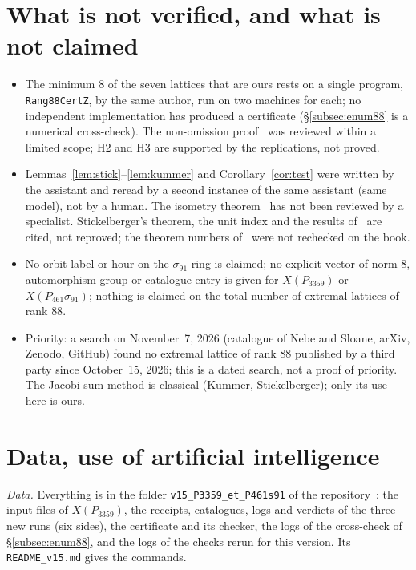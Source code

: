 \documentclass[11pt,a4paper]{amsart}
\theoremstyle{plain}
\theoremstyle{definition}
\newcommand{\XA}{X(P_{3359})}
\newcommand{\XB}{X(P_{461}\sigma_{91})}
\begin{document}
\section{What is not verified, and what is not claimed}\label{sec:limites}
\begin{itemize}
\item The minimum $8$ of the seven lattices that are ours rests on a single program, \texttt{Rang88CertZ}, by the same author, run on two machines for each; no independent implementation has produced a certificate (\S\ref{subsec:enum88} is a numerical cross-check). The non-omission proof~\cite[Thm.~5.1]{Gau26} was reviewed within a limited scope; H2 and H3 are supported by the replications, not proved.
\item Lemmas~\ref{lem:stick}--\ref{lem:kummer} and Corollary~\ref{cor:test} were written by the assistant and reread by a second instance of the same assistant (same model), not by a human. The isometry theorem~\cite[Thm.~3.3]{Gau26} has not been reviewed by a specialist. Stickelberger's theorem, the unit index and the results of~\cite{Sak26} are cited, not reproved; the theorem numbers of~\cite{Was97} were not rechecked on the book.
\item No orbit label or hour on the $\sigma_{91}$-ring is claimed; no explicit vector of norm $8$, automorphism group or catalogue entry is given for $\XA$ or $\XB$; nothing is claimed on the total number of extremal lattices of rank $88$.
\item Priority: a search on November~7, 2026 (catalogue of Nebe and Sloane, arXiv, Zenodo, GitHub) found no extremal lattice of rank $88$ published by a third party since October~15, 2026; this is a dated search, not a proof of priority. The Jacobi-sum method is classical (Kummer, Stickelberger); only its use here is ours.
\end{itemize}

\section*{Data, use of artificial intelligence}
\emph{Data.} Everything is in the folder \texttt{v15\_P3359\_et\_P461s91} of the repository~\cite{Gau26b}: the input files of $\XA$, the receipts, catalogues, logs and verdicts of the three new runs (six sides), the certificate and its checker, the logs of the cross-check of \S\ref{subsec:enum88}, and the logs of the checks rerun for this version. Its \texttt{README\_v15.md} gives the commands.
\end{document}
